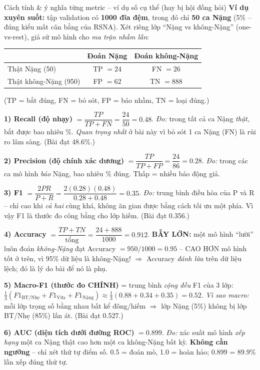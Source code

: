 \documentclass[12pt,a4paper]{article}
\begin{document}
\begin{ctbox}{Cách tính \& ý nghĩa từng metric -- ví dụ số cụ thể (hay bị hội đồng hỏi)}
\textbf{Ví dụ xuyên suốt:} tập validation có \textbf{1000 đĩa đệm}, trong đó chỉ \textbf{50 ca Nặng} (5\% -- đúng kiểu mất cân bằng của RSNA). Xét riêng lớp ``Nặng vs không-Nặng'' (one-vs-rest), giả sử mô hình cho \emph{ma trận nhầm lẫn}:
\begin{center}\small
\begin{tabular}{lcc}
\toprule
 & Đoán Nặng & Đoán không-Nặng \\
\midrule
Thật Nặng (50)        & TP $=24$ & FN $=26$ \\
Thật không-Nặng (950) & FP $=62$ & TN $=888$ \\
\bottomrule
\end{tabular}
\end{center}
(TP = bắt đúng, FN = bỏ sót, FP = báo nhầm, TN = loại đúng.)

\textbf{1) Recall (độ nhạy)} $=\dfrac{TP}{TP+FN}=\dfrac{24}{50}=0.48$. \emph{Đo:} trong tất cả ca Nặng \emph{thật}, bắt được bao nhiêu \%. \emph{Quan trọng nhất} ở bài này vì bỏ sót 1 ca Nặng (FN) là rủi ro lâm sàng. (Bài đạt 48.6\%.)

\textbf{2) Precision (độ chính xác dương)} $=\dfrac{TP}{TP+FP}=\dfrac{24}{86}=0.28$. \emph{Đo:} trong các ca mô hình \emph{báo} Nặng, bao nhiêu \% đúng. Thấp = nhiều báo động giả.

\textbf{3) F1} $=\dfrac{2PR}{P+R}=\dfrac{2(0.28)(0.48)}{0.28+0.48}=0.35$. \emph{Đo:} trung bình điều hòa của P và R -- chỉ cao khi \emph{cả hai} cùng khá, không ăn gian được bằng cách tối ưu một phía. Vì vậy F1 là thước đo công bằng cho lớp hiếm. (Bài đạt 0.356.)

\textbf{4) Accuracy} $=\dfrac{TP+TN}{\text{tổng}}=\dfrac{24+888}{1000}=0.912$. \textbf{BẪY LỚN:} một mô hình ``lười'' luôn đoán \emph{không-Nặng} đạt Accuracy $=950/1000=\mathbf{0.95}$ -- CAO HƠN mô hình tốt ở trên, vì 95\% dữ liệu là không-Nặng! $\Rightarrow$ Accuracy \emph{đánh lừa} trên dữ liệu lệch; đó là lý do bài để nó là phụ.

\textbf{5) Macro-F1 (thước đo CHÍNH)} = trung bình \emph{cộng đều} F1 của 3 lớp: $\frac{1}{3}(F1_{\text{BT/Nhẹ}}+F1_{\text{Vừa}}+F1_{\text{Nặng}})\approx\frac{1}{3}(0.88+0.34+0.35)=0.52$. \emph{Vì sao macro:} mỗi lớp trọng số bằng nhau bất kể đông/hiếm $\Rightarrow$ lớp Nặng (5\%) không bị lớp BT/Nhẹ (85\%) lấn át. (Bài đạt 0.527.)

\textbf{6) AUC (diện tích dưới đường ROC)} $=0.899$. \emph{Đo:} xác suất mô hình \emph{xếp hạng} một ca Nặng thật cao hơn một ca không-Nặng bất kỳ. \textbf{Không cần ngưỡng} -- chỉ xét thứ tự điểm số. 0.5 = đoán mò, 1.0 = hoàn hảo; 0.899 = 89.9\% lần xếp đúng thứ tự.


\end{ctbox}
\end{document}

